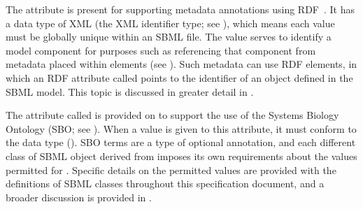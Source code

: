 

\label{sec:metaid}

The  attribute is present for supporting metadata
annotations using RDF~\citep[Resource Description
Format;][]{lassila:1999}.  It has a data type of XML 
(the XML identifier type; see ), which means
each  value must be globally unique within an SBML
file.  The  value serves to identify a model
component for purposes such as referencing that component from
metadata placed within  elements (see
).  Such metadata can use RDF
 elements, in which an RDF attribute called
 points to the  identifier of an
object defined in the SBML model.  This topic is discussed in
greater detail in .


\label{sec:sbase-sboterm}

The attribute called  is provided on \SBase to
support the use of the Systems Biology Ontology (SBO; see
).  When a value is given to this attribute,
it must conform to the data type 
().  SBO terms are a type of
optional annotation, and each different class of SBML object
derived from \SBase imposes its own requirements about the values
permitted for .  Specific details on the permitted
values are provided with the definitions of SBML classes
throughout this specification document, and a broader discussion
is provided in .


\label{sec:notes}

